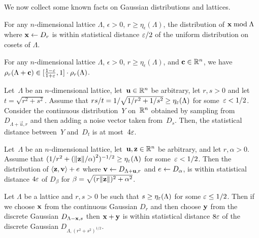 We now collect some known facts on Gaussian distributions and lattices.

\begin{lemma}
  \label{lem:smoothingcontinuous}
  For any $n$-dimensional lattice $\Lambda$, $\epsilon>0$, $r \geq
  \eta_{\epsilon}(\Lambda)$, the distribution of $\mathbf{x} \bmod \Lambda$ where $\mathbf{x} \leftarrow D_{r}$ is
	within statistical distance $\varepsilon/2$ of the uniform distribution on cosets of $\Lambda$.
\end{lemma}

\begin{lemma}
  \label{lem:smoothing}
  For any $n$-dimensional lattice $\Lambda$, $\epsilon>0$, $r \geq
  \eta_{\epsilon}(\Lambda)$, and $\mathbf{c} \in \mathbb{R}^n$, we have $\rho_{r}(\Lambda + \mathbf{c}) \in [
  \tfrac{1-\varepsilon}{1+\varepsilon}, 1 ] \cdot \rho_{r}(\Lambda)$.
\end{lemma}

\begin{lemma}
\label{le:discrete_plus_cont_Gauss}
Let~$\Lambda$ be an $n$-dimensional lattice, let~$\mathbf{u}\in \mathbb{R}^n$ be
arbitrary, let $r, s > 0$ and let $t=\sqrt{r^2+ s^2}$. Assume that
$rs/t=1/\sqrt{1/r^2+1/s^2} \geq \eta_{\varepsilon} (\Lambda)$ for some~$\varepsilon <
1/2$. Consider the continuous distribution~$Y$ on~$\mathbb{R}^n$ obtained by
sampling from~$D_{\Lambda+\vec{u},r}$ and then adding a noise vector taken
from~$D_s$. Then, the statistical distance between~$Y$ and~$D_t$ is at
most~$4\varepsilon$.
\end{lemma}

\begin{lemma}
\label{lem:smoothip}
Let~$\Lambda$ be an $n$-dimensional lattice, let~$\mathbf{{u}}, \mathbf{{z}}\in \mathbb{R}^n$ be arbitrary, and let $r, \alpha > 0$. Assume that
$(1/r^2+\left(\|{\mathbf{{z}}}\|/\alpha\right)^2)^{-1/2} \geq \eta_{\varepsilon} (\Lambda)$ for some~$\varepsilon <
1/2$. Then the distribution of $\langle\mathbf{{z}},\mathbf{{v}}\rangle+e$ where $\mathbf{{v}} \gets D_{\Lambda+\mathbf{{u}}, r}$ and $e \gets D_{\alpha}$, is within statistical distance $4\varepsilon$ of $D_{\beta}$ for $\beta = \sqrt{(r \|\mathbf{{z}}\|)^2+\alpha^2}$.
\end{lemma}

\begin{lemma}
\label{lem:peikertdiscretegauss}
Let $\Lambda$ be a lattice and $r,s>0$ be such that $s \ge \eta_\varepsilon(\Lambda)$ for some $\varepsilon \le 1/2$.
Then if we choose $\mathbf{x}$ from the continuous Gaussian $D_{r}$ and then choose $\mathbf{y}$ from the
discrete Gaussian $D_{\Lambda-\mathbf{x},s}$ then $\mathbf{x}+\mathbf{y}$ is within statistical distance $8 \varepsilon$ of
the discrete Gaussian $D_{\Lambda,(r^2+s^2)^{1/2}}$.
\end{lemma}


